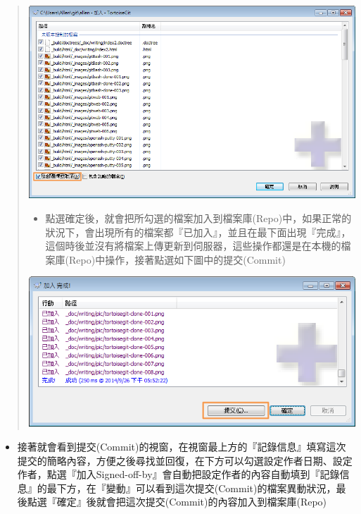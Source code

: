 \documentclass[letterpaper,10pt,english]{sphinxmanual}
\begin{document}
\begin{quote}

\includegraphics{tortoisegit-push-002.png}
\begin{itemize}
\item {} 
點選確定後，就會把所勾選的檔案加入到檔案庫(Repo)中，如果正常的狀況下，會出現所有的檔案都『已加入』，並且在最下面出現『完成』，這個時後並沒有將檔案上傳更新到伺服器，這些操作都還是在本機的檔案庫(Repo)中操作，接著點選如下圖中的提交(Commit)

\end{itemize}

\includegraphics{tortoisegit-push-003.png}
\end{quote}
\begin{itemize}
\item {} 
接著就會看到提交(Commit)的視窗，在視窗最上方的『記錄信息』填寫這次提交的簡略內容，方便之後尋找並回復，在下方可以勾選設定作者日期、設定作者，點選『加入Signed-off-by』會自動把設定作者的內容自動填到『記錄信息』的最下方，在『變動』可以看到這次提交(Commit)的檔案異動狀況，最後點選『確定』後就會把這次提交(Commit)的內容加入到檔案庫(Repo)

\end{itemize}
\end{document}
